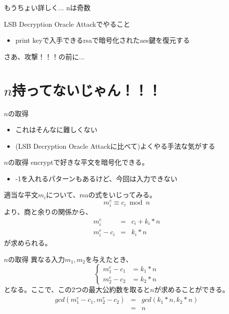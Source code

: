 \documentclass[dvipdfmx]{beamer}
\begin{document}
\begin{frame}{もうちょい詳しく...}
  nは奇数
\end{frame}

\begin{frame}{LSB Decryption Oracle Attackでやること}
  \begin{itemize}
  \item print keyで入手できるrsaで暗号化されたaes鍵を復元する
  \end{itemize}
  
  さあ、攻撃！！！の前に...
\end{frame}

\section{$n$持ってないじゃん！！！}

\begin{frame}{$n$の取得}
  \begin{itemize}
  \item これはそんなに難しくない
  \item (LSB Decryption Oracle Attackに比べて)よくやる手法な気がする
  \end{itemize}
\end{frame}

\begin{frame}{$n$の取得}
  encryptで好きな平文を暗号化できる。
  \begin{itemize}
  \item -1を入れるパターンもあるけど、今回は入力できない
  \end{itemize}

  適当な平文$m_i$について、rsaの式をいじってみる。
  \begin{equation}
    m_i ^ e \equiv c_i \bmod{n} \nonumber
  \end{equation}
  より、商と余りの関係から、
  \begin{eqnarray}
    m_i ^ e &=& c_i + k_i * n \nonumber \\
    m_i ^e - c_i &= & k_i * n \nonumber
  \end{eqnarray}
  が求められる。
\end{frame}

\begin{frame}{$n$の取得}
  異なる入力$m_1, m_2$を与えたとき、
  \begin{equation}
    \begin{cases}
      m_1 ^e - c_1 &= k_1 * n \\
      m_2 ^e - c_2 &= k_2 * n
    \end{cases}\nonumber
  \end{equation}
  となる。ここで、この2つの最大公約数を取ると$n$が求めることができる。
  \begin{eqnarray}
    gcd(m_1^e - c_1, m_2^e - c_2) &=& gcd(k_1*n, k_2*n) \nonumber \\
    &=& n \nonumber
  \end{eqnarray}
\end{frame}
\end{document}
